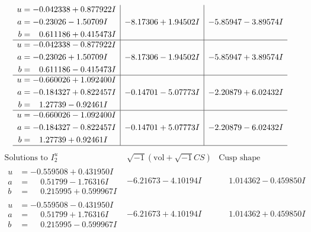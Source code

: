 \documentclass[1p]{elsarticle_modified}
\theoremstyle{definition}
\newcommand{\I}{\sqrt{-1}}
\begin{document}
$$\begin{array}{c|c|c}
\begin{aligned}
u &= -0.042338 + 0.877922 I \\
a &= -0.23026 - 1.50709 I \\
b &= \phantom{-}0.611186 + 0.415473 I\end{aligned}
 & -8.17306 + 1.94502 I & -5.85947 - 3.89574 I \\ \hline\begin{aligned}
u &= -0.042338 - 0.877922 I \\
a &= -0.23026 + 1.50709 I \\
b &= \phantom{-}0.611186 - 0.415473 I\end{aligned}
 & -8.17306 - 1.94502 I & -5.85947 + 3.89574 I \\ \hline\begin{aligned}
u &= -0.660026 + 1.092400 I \\
a &= -0.184327 + 0.822457 I \\
b &= \phantom{-}1.27739 - 0.92461 I\end{aligned}
 & -0.14701 - 5.07773 I & -2.20879 + 6.02432 I \\ \hline\begin{aligned}
u &= -0.660026 - 1.092400 I \\
a &= -0.184327 - 0.822457 I \\
b &= \phantom{-}1.27739 + 0.92461 I\end{aligned}
 & -0.14701 + 5.07773 I & -2.20879 - 6.02432 I\\
 \hline 
 \end{array}$$\newpage$$\begin{array}{c|c|c}  
\text{Solutions to }I^u_{2}& \I (\text{vol} + \sqrt{-1}CS) & \text{Cusp shape}\\
 \hline 
\begin{aligned}
u &= -0.559508 + 0.431950 I \\
a &= \phantom{-}0.51799 - 1.76316 I \\
b &= \phantom{-}0.215995 + 0.599967 I\end{aligned}
 & -6.21673 - 4.10194 I & \phantom{-}1.014362 - 0.459850 I \\ \hline\begin{aligned}
u &= -0.559508 - 0.431950 I \\
a &= \phantom{-}0.51799 + 1.76316 I \\
b &= \phantom{-}0.215995 - 0.599967 I\end{aligned}
 & -6.21673 + 4.10194 I & \phantom{-}1.014362 + 0.459850 I \\ \hline\begin{aligned}

\end{aligned}
\end{array}$$
\end{document}
